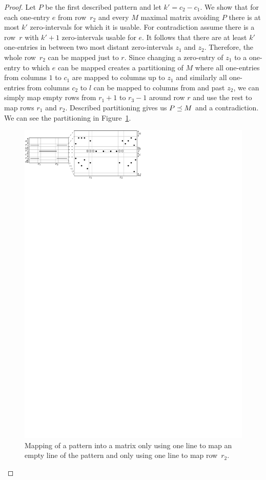 \begin{proof}
Let $P$ be the first described pattern and let $k'=c_2-c_1$. We show that for each one-entry $e$ from row~$r_2$ and every $M$ maximal matrix avoiding $P$ there is at most $k'$ zero-intervals for which it is usable. For contradiction assume there is a row~$r$ with $k'+1$ zero-intervals usable for $e$. It follows that there are at least $k'$ one-entries in between two most distant zero-intervals $z_1$ and $z_2$. Therefore, the whole row~$r_2$ can be mapped just to $r$. Since changing a zero-entry of $z_1$ to a one-entry to which $e$ can be mapped creates a partitioning of $M$ where all one-entries from columns $1$ to $c_1$ are mapped to columns up to $z_1$ and similarly all one-entries from columns $c_2$ to $l$ can be mapped to columns from and past $z_2$, we can simply map empty rows from $r_1+1$ to $r_3-1$ around row $r$ and use the rest to map rows $r_1$ and $r_2$. Described partitioning gives us $P\preceq M$ and a contradiction. We can see the partitioning in Figure~\ref{fig:lemmaH1}.
\begin{figure}[!ht]
\centering
\includegraphics[width=\textwidth]{img/lemmaH1.pdf}
\caption{Mapping of a pattern into a matrix only using one line to map an empty line of the pattern and only using one line to map row~$r_2$.}
\label{fig:lemmaH1}
\end{figure}


\end{proof}
